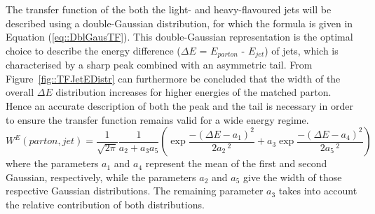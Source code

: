 The transfer function of the both the light- and heavy-flavoured jets will be described using a double-Gaussian distribution, for which the formula is given in Equation (\ref{eq::DblGausTF}).
This double-Gaussian representation is the optimal choice to describe the energy difference ($\Delta E$ = $E_{parton}$ - $E_{jet}$) of jets, which is characterised by a sharp peak combined with an asymmetric tail. 
From Figure~\ref{fig::TFJetEDistr} can furthermore be concluded that the width of the overall $\Delta E$ distribution increases for higher energies of the matched parton. Hence an accurate description of both the peak and the tail is necessary in order to ensure the transfer function remains valid for a wide energy regime.
\begin{equation} \label{eq::DblGausTF}
 W^{E}(parton, jet) = \frac{1}{\sqrt{2\pi}} \frac{1}{a_2 + a_3 a_5} \left( \exp \frac{-(\Delta E - a_1)^2}{2 a_2 \,^{2}} + a_3 \exp \frac{-(\Delta E - a_4)^2}{2 a_5 \,^{2}} \right) 
\end{equation}
where the parameters $a_1$ and $a_4$ represent the mean of the first and second Gaussian, respectively, while the parameters $a_2$ and $a_5$ give the width of those respective Gaussian distributions.
The remaining parameter $a_3$ takes into account the relative contribution of both distributions.
\\

